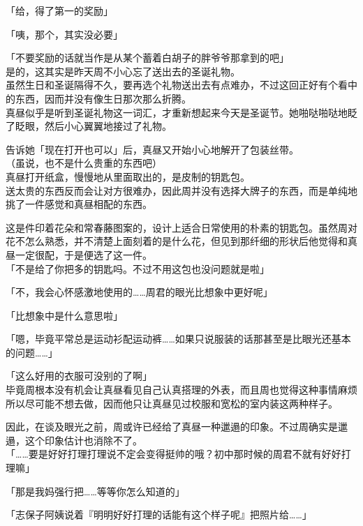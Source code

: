 「给，得了第一的奖励」

「咦，那个，其实没必要」

「不要奖励的话就当作是从某个蓄着白胡子的胖爷爷那拿到的吧」\\

是的，这其实是昨天周不小心忘了送出去的圣诞礼物。\\

虽然生日和圣诞隔得不久，要再选个礼物送出去有点难办，不过这回正好有个看中的东西，因而并没有像生日那次那么折腾。\\

真昼似乎是听到圣诞礼物这一词汇，才重新想起来今天是圣诞节。她啪哒啪哒地眨了眨眼，然后小心翼翼地接过了礼物。

告诉她「现在打开也可以」后，真昼又开始小心地解开了包装丝带。\\

（虽说，也不是什么贵重的东西吧）\\

真昼打开纸盒，慢慢地从里面取出的，是皮制的钥匙包。\\

送太贵的东西反而会让对方很难办，因此周并没有选择大牌子的东西，而是单纯地挑了一件感觉和真昼相配的东西。

这是件印着花朵和常春藤图案的，设计上适合日常使用的朴素的钥匙包。虽然周对花不怎么熟悉，并不清楚上面刻着的是什么花，但见到那纤细的形状后他觉得和真昼一定很配，于是便选了这一件。\\

「不是给了你把多的钥匙吗。不过不用这包也没问题就是啦」

「不，我会心怀感激地使用的……周君的眼光比想象中更好呢」

「比想象中是什么意思啦」

「嗯，毕竟平常总是运动衫配运动裤……如果只说服装的话那甚至是比眼光还基本的问题……」

「这么好用的衣服可没别的了啊」\\

毕竟周根本没有机会让真昼看见自己认真搭理的外表，而且周也觉得这种事情麻烦所以尽可能不想去做，因而他只让真昼见过校服和宽松的室内装这两种样子。

因此，在谈及眼光之前，周或许已经给了真昼一种邋遢的印象。不过周确实是邋遢，这个印象估计也消除不了。\\

「……要是好好打理打理说不定会变得挺帅的哦？初中那时候的周君不就有好好打理嘛」

「那是我妈强行把……等等你怎么知道的」

「志保子阿姨说着『明明好好打理的话能有这个样子呢』把照片给……」

